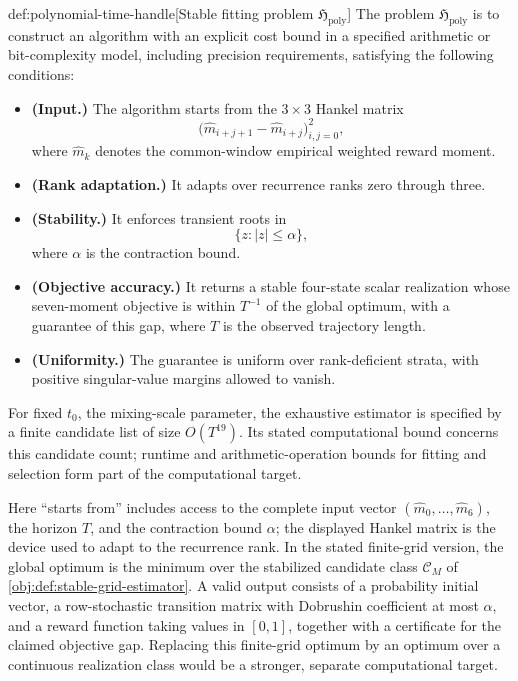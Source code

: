 \documentclass[11pt]{article}
\begin{document}
\begin{definitionv}{def:polynomial-time-handle}[Stable fitting problem \(\mathfrak H_{\mathrm{poly}}\)]
The problem \(\mathfrak H_{\mathrm{poly}}\) is to construct an algorithm with an explicit cost bound in a specified arithmetic or bit-complexity model, including precision requirements, satisfying the following conditions:
\begin{itemize}
\item \textbf{(Input.)} The algorithm starts from the \(3\times3\) Hankel matrix
\[
\bigl(\widehat m_{i+j+1}-\widehat m_{i+j}\bigr)_{i,j=0}^{2},
\]
where \(\widehat m_k\) denotes the common-window empirical weighted reward moment.
\item \textbf{(Rank adaptation.)} It adapts over recurrence ranks zero through three.
\item \textbf{(Stability.)} It enforces transient roots in
\[
\{z:|z|\leq\alpha\},
\]
where \(\alpha\) is the contraction bound.
\item \textbf{(Objective accuracy.)} It returns a stable four-state scalar realization whose seven-moment objective is within \(T^{-1}\) of the global optimum, with a guarantee of this gap, where \(T\) is the observed trajectory length.
\item \textbf{(Uniformity.)} The guarantee is uniform over rank-deficient strata, with positive singular-value margins allowed to vanish.
\end{itemize}
For fixed \(t_0\), the mixing-scale parameter, the exhaustive estimator is specified by a finite candidate list of size \(O(T^{19})\). Its stated computational bound concerns this candidate count; runtime and arithmetic-operation bounds for fitting and selection form part of the computational target.
\end{definitionv}

Here ``starts from'' includes access to the complete input vector \((\widehat m_0,\ldots,\widehat m_6)\), the horizon \(T\), and the contraction bound \(\alpha\); the displayed Hankel matrix is the device used to adapt to the recurrence rank. In the stated finite-grid version, the global optimum is the minimum over the stabilized candidate class \(\mathcal C_M\) of \cref{obj:def:stable-grid-estimator}. A valid output consists of a probability initial vector, a row-stochastic transition matrix with Dobrushin coefficient at most \(\alpha\), and a reward function taking values in \([0,1]\), together with a certificate for the claimed objective gap. Replacing this finite-grid optimum by an optimum over a continuous realization class would be a stronger, separate computational target.
\end{document}

